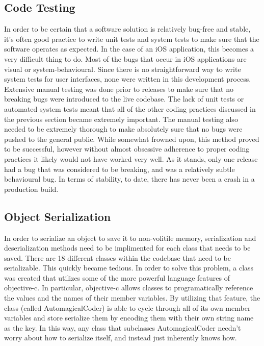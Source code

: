 \documentclass[se]{uw-wkrpt}
\begin{document}
\subsection{Code Testing}

In order to be certain that a software solution is relatively bug-free and stable,
it's often good practice to write unit tests and system tests to make sure that
the software operates as expected. In the case of an iOS application, this becomes
a very difficult thing to do. Most of the bugs that occur in iOS applications are
visual or system-behavioural. Since there is no straightforward way to write system
tests for user interfaces, none were written in this development process. Extensive 
manual testing was done prior to releases to make sure that no breaking bugs were
introduced to the live codebase. The lack of unit tests or automated system tests
meant that all of the other coding practices discussed in the previous section became
extremely important. The manual testing also needed to be extremely thorough to make
absolutely sure that no bugs were pushed to the general public. While somewhat frowned
upon, this method proved to be successful, however without almost obsessive adherence
to proper coding practices it likely would not have worked very well. As it stands, only
one release had a bug that was considered to be breaking, and was a relatively subtle
behavioural bug. In terms of stability, to date, there has never been a crash in a
production build.

\subsection{Object Serialization}

In order to serialize an object to save it to non-volitile memory,
serialization and deserialization methods need to be implimented for each class that
needs to be saved. There are 18 different classes within the codebase that need to
be serializable. This quickly became tedious. In order to solve this problem, a class
was created that utilizes some of the more powerful language features of objective-c.
In particular, objective-c allows classes to programatically reference the values
and the names of their member variables. By utilizing that feature, the class (called AutomagicalCoder)  is able
to cycle through all of its own member variables and store serialize them by encoding them
with their own string name as the key. In this way, any class that subclasses AutomagicalCoder
needn't worry about how to serialize itself, and instead just inherently knows how.
\end{document}
